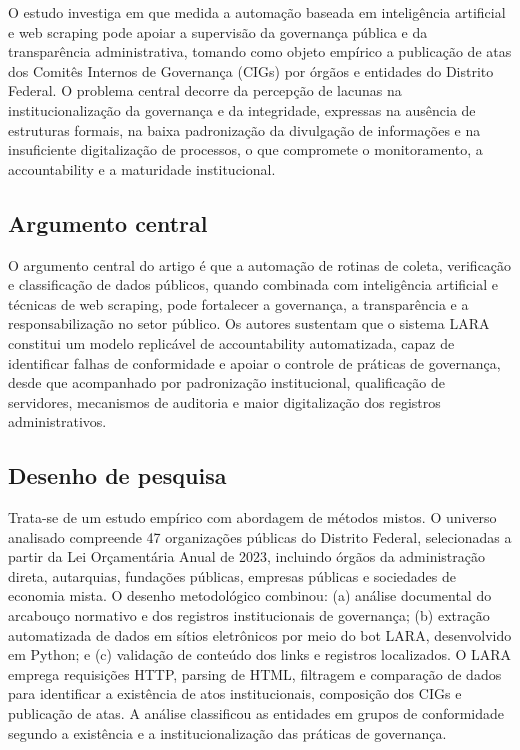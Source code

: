 \documentclass[12pt,a4paper]{article}
\begin{document}
O estudo investiga em que medida a automação baseada em inteligência artificial e web scraping pode apoiar a supervisão da governança pública e da transparência administrativa, tomando como objeto empírico a publicação de atas dos Comitês Internos de Governança (CIGs) por órgãos e entidades do Distrito Federal. O problema central decorre da percepção de lacunas na institucionalização da governança e da integridade, expressas na ausência de estruturas formais, na baixa padronização da divulgação de informações e na insuficiente digitalização de processos, o que compromete o monitoramento, a accountability e a maturidade institucional.

\subsection{Argumento central}
\label{sec:orga49beba}

O argumento central do artigo é que a automação de rotinas de coleta, verificação e classificação de dados públicos, quando combinada com inteligência artificial e técnicas de web scraping, pode fortalecer a governança, a transparência e a responsabilização no setor público. Os autores sustentam que o sistema LARA constitui um modelo replicável de accountability automatizada, capaz de identificar falhas de conformidade e apoiar o controle de práticas de governança, desde que acompanhado por padronização institucional, qualificação de servidores, mecanismos de auditoria e maior digitalização dos registros administrativos.

\subsection{Desenho de pesquisa}
\label{sec:org9430658}

Trata-se de um estudo empírico com abordagem de métodos mistos. O universo analisado compreende 47 organizações públicas do Distrito Federal, selecionadas a partir da Lei Orçamentária Anual de 2023, incluindo órgãos da administração direta, autarquias, fundações públicas, empresas públicas e sociedades de economia mista. O desenho metodológico combinou: (a) análise documental do arcabouço normativo e dos registros institucionais de governança; (b) extração automatizada de dados em sítios eletrônicos por meio do bot LARA, desenvolvido em Python; e (c) validação de conteúdo dos links e registros localizados. O LARA emprega requisições HTTP, parsing de HTML, filtragem e comparação de dados para identificar a existência de atos institucionais, composição dos CIGs e publicação de atas. A análise classificou as entidades em grupos de conformidade segundo a existência e a institucionalização das práticas de governança.
\end{document}
